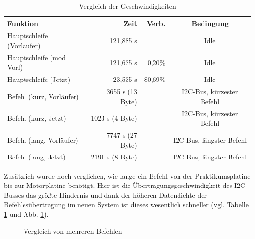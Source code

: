 \begin{table}[htb]
\begin{center}
	\begin{tabular}{|l||r|r|c|}
		\hline
		\textbf{Funktion} & \textbf{Zeit} & \textbf{Verb.} & \textbf{Bedingung} \\ \hline \hline
		Hauptschleife (Vorläufer) & 121,885 \textmu{}s & & Idle \\ \hline
		Hauptschleife (mod Vorl) & 121,635 \textmu{}s & 0,20\% & Idle \\ \hline
		Hauptschleife (Jetzt) & 23,535 \textmu{}s & 80,69\% & Idle \\ \hline \hline
		Befehl (kurz, Vorläufer) & 3655 \textmu{}s (13 Byte) & & I2C-Bus, kürzester Befehl \\ \hline
		Befehl (kurz, Jetzt) & 1023 \textmu{}s (4 Byte) & & I2C-Bus, kürzester Befehl \\ \hline
		Befehl (lang, Vorläufer) & 7747 \textmu{}s (27 Byte) & & I2C-Bus, längster Befehl \\ \hline
		Befehl (lang, Jetzt) & 2191 \textmu{}s (8 Byte) & & I2C-Bus, längster Befehl \\ \hline
	\end{tabular}
	\caption{\label{vergl_speed} Vergleich der Geschwindigkeiten}
\end{center}
\end{table}
Zusätzlich wurde noch verglichen, wie lange ein Befehl von der Praktikumsplatine bis zur Motorplatine benötigt.
Hier ist die Übertragungsgeschwindigkeit des I2C-Busses das größte Hindernis und dank der höheren Datendichte
der Befehlesübertragung im neuen System ist dieses wesentlich schneller (vgl. Tabelle \ref{vergl_speed} und Abb.
 \ref{vergl_befehle}).
\begin{figure}[htb]
 \centering
 \caption{\label{vergl_befehle}Vergleich von mehreren Befehlen}
\end{figure}
